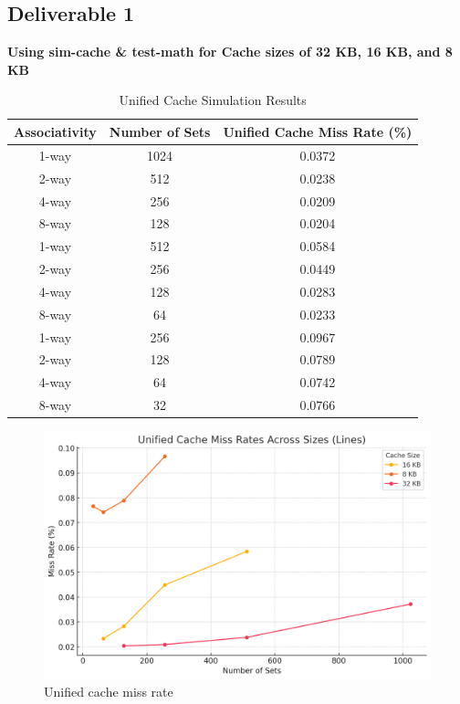 \documentclass{article}
\begin{document}
\subsection{Deliverable 1}
\textbf{Using sim-cache \& test-math for Cache sizes of 32 KB, 16 KB, and 8 KB}
\begin{table}[h!]
	\centering
	\begin{tabular}{ccc}
		\toprule
		\textbf{Associativity} & \textbf{Number of Sets} & \textbf{Unified Cache Miss Rate (\%)} \\
		\midrule
		1-way  & 1024 &  0.0372  \\
		2-way  & 512  &   0.0238 \\
		4-way  & 256  &  0.0209  \\
		8-way  & 128  &   0.0204 \\
		\midrule
		1-way  & 512  &   0.0584 \\
		2-way  & 256  &   0.0449 \\
		4-way  & 128  &   0.0283 \\
		8-way  & 64   &   0.0233 \\
		\midrule
		1-way  & 256  &    0.0967\\
		2-way  & 128  &    0.0789\\
		4-way  & 64   &    0.0742\\
		8-way  & 32   &    0.0766\\
		\bottomrule
	\end{tabular}
	\caption{Unified Cache Simulation Results}
\end{table}
\begin{figure}[H]
	\centering
	\includegraphics[scale=0.5]{deliv1_unified.png}
	\caption{Unified cache miss rate}
	\label{fig:Unifed Cache Results}
\end{figure}
\end{document}

